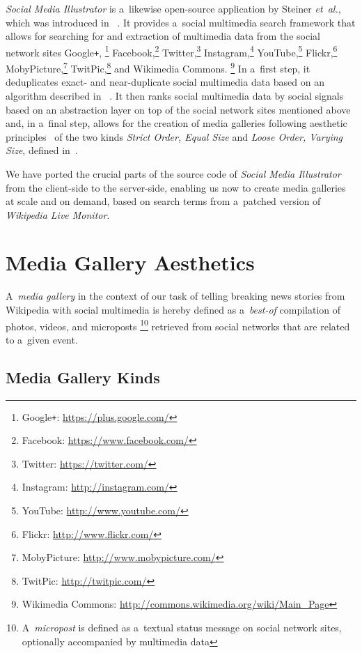 \documentclass{sig-alternate-somus}
\newcommand{\inlinelistingsize}{\fontsize{8pt}{11pt}}
\let\oldurl\url
\renewcommand{\url}[1]{\inlinelistingsize\oldurl{#1}}
\begin{document}
\emph{Social Media Illustrator} is a~likewise
open-source application by Steiner \emph{et~al.},
which was introduced in%
~\cite{steiner2013meteoroid,steiner2013tocrop}.
It provides a~social multimedia search framework
that allows for searching for and extraction of
multimedia data from the social network sites
Google\texttt{+},%
\footnote{Google\texttt{+}: \url{https://plus.google.com/}}
Facebook,\footnote{Facebook: \url{https://www.facebook.com/}}
Twitter,\footnote{Twitter: \url{https://twitter.com/}}
Instagram,\footnote{Instagram: \url{http://instagram.com/}}
YouTube,\footnote{YouTube: \url{http://www.youtube.com/}}
Flickr,\footnote{Flickr: \url{http://www.flickr.com/}}
MobyPicture,\footnote{MobyPicture: \url{http://www.mobypicture.com/}}
TwitPic,\footnote{TwitPic: \url{http://twitpic.com/}}
and Wikimedia Commons.%
\footnote{Wikimedia Commons: \url{http://commons.wikimedia.org/wiki/Main_Page}}
In a~first step, it deduplicates exact- and near-duplicate
social multimedia data based on an algorithm described in%
~\cite{steiner2013clustering}.
It then ranks social multimedia data by social signals%
~\cite{steiner2013meteoroid} based on an abstraction layer
on top of the social network sites mentioned above
and, in a~final step, allows for the creation of media galleries
following aesthetic principles~\cite{steiner2012aesthetic}
of the two kinds \emph{Strict Order, Equal Size}
and \emph{Loose Order, Varying Size},
defined in~\cite{steiner2013tocrop}.

We have ported the crucial parts
of the source code of \emph{Social Media Illustrator}
from the client-side to the server-side,
enabling us now to create media galleries at scale and on demand,
based on search terms from a~patched version of \emph{Wikipedia Live Monitor}.

\section{Media Gallery Aesthetics}
\label{sec:media-gallery-aesthetics}
\selectfont

A~\emph{media gallery} in the context of our task of
telling breaking news stories from Wikipedia with social multimedia
is hereby defined as a~\emph{best-of} compilation of photos, videos,
and microposts%
\footnote{A~\emph{micropost} is defined as a~textual status message
on social network sites, optionally accompanied by multimedia data}
retrieved from social networks that are related to a~given event.

\subsection{Media Gallery Kinds}
\end{document}
